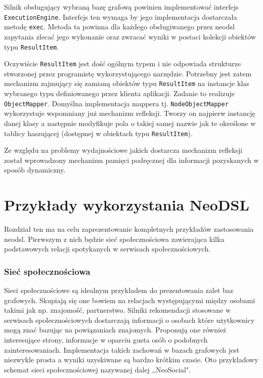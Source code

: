 \documentclass[brudnopis]{xmgr}
\begin{document}
Silnik obsługujący wybraną bazę grafową powinien implementować interfejs \texttt{ExecutionEngine}. Interfejs ten wymaga by jego implementacja dostarczała metodę \texttt{exec}. Metoda ta powinna dla każdego obsługiwanego przez neodsl zapytania zlecać jego wykonanie oraz zwracać wyniki w postaci kolekcji obiektów typu \texttt{ResultItem}.

Oczywiście \texttt{ResultItem} jest dość ogólnym typem i nie odpowiada strukturze stworzonej przez programistę wykorzystującego narzędzie. Potrzebny jest zatem mechanizm zajmujący się zamianą obiektów typu \texttt{ResultItem} na instancje klas wybranego typu definiowanego przez klienta aplikacji. Zadanie to realizuje \texttt{ObjectMapper}. Domyślna implementacja mappera tj. \texttt{NodeObjectMapper} wykorzystuje wspomniany już mechanizm refleksji. Tworzy on najpierw instancję danej klasy a następnie modyfikuje pola o takiej samej nazwie jak te określone w tablicy haszującej (dostępnej w obiektach typu \texttt{ResultItem}).

Ze względu na problemy wydajnościowe jakich dostarcza mechanizm refleksji został wprowadzony mechanizm pamięci podręcznej dla informacji pozyskanych w sposób dynamiczny.

\chapter{Przykłady wykorzystania NeoDSL}

Rozdział ten ma na celu zaprezentowanie kompletnych przykładów zastosowania neodsl. Pierwszym z nich będzie sieć społecznościowa zawierająca kilka podstawowych relacji spotykanych w serwisach społecznościowych.

\subsection{Sieć społecznościowa}

Sieci społecznościowe są idealnym przykładem do prezentowania zalet baz grafowych. Skupiają się one bowiem na relacjach występującymi między osobami takimi jak np. znajomość, partnerstwo. Silniki rekomendacji stosowane w serwisach społecznościowych dostarczają informacji o osobach które użytkownicy mogą znać bazując na powiązaniach znajomych. Proponują one również interesujące strony, informacje w oparciu gusta osób o podobnych zainteresowaniach. Implementacja takich zachowań w bazach grafowych jest niezwykle prosta a wyniki uzyskiwane są bardzo krótkim czasie. Oto przykładowy schemat sieci społecznościowej nazywanej dalej ,,NeoSocial".
\end{document}
